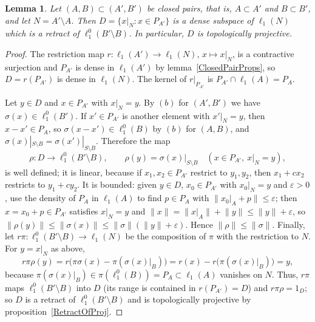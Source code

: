 \documentclass[12pt]{article}
\newtheorem{lemma}[theorem]{Lemma}
\newcommand{\lo}[1]{\ell_1^0(#1)}
\newcommand{\ellone}[1]{\ell_1(#1)}
\newcommand{\norm}[1]{\lVert #1\rVert}
\begin{document}
\begin{lemma}\label{BlockRetract} Let $(A,B)\subset(A',B')$ be closed pairs,
    that is, $A\subset A'$ and $B\subset B'$, and let $N=A'\setminus A$. Then
    $D=\{x|_N:x\in P_{A'}\}$ is a dense subspace of $\ellone{N}$ which is a
    retract of $\lo{B'\setminus B}$. In particular, $D$ is topologically
    projective.
\end{lemma}
\begin{proof} The restriction map $r:\ellone{A'}\to\ellone{N}$, $x\mapsto x|_N$,
    is a contractive surjection and $P_{A'}$ is dense in $\ellone{A'}$ by
    lemma~\ref{ClosedPairProps}, so $D=r(P_{A'})$ is dense in $\ellone{N}$.
    The kernel of $r|_{P_{A'}}$ is $P_{A'}\cap\ellone{A}=P_A$.

    Let $y\in D$ and $x\in P_{A'}$ with $x|_N=y$. By $(b)$ for $(A',B')$ we
    have $\sigma(x)\in\lo{B'}$. If $x'\in P_{A'}$ is another element with
    $x'|_N=y$, then $x-x'\in P_A$, so $\sigma(x-x')\in\lo{B}$ by $(b)$ for
    $(A,B)$, and $\sigma(x)|_{S\setminus B}=\sigma(x')|_{S\setminus B}$.
    Therefore the map
    \[
    \rho:D\to\lo{B'\setminus B},\qquad\rho(y)=\sigma(x)|_{S\setminus B}
    \quad(x\in P_{A'},\ x|_N=y),
    \]
    is well defined; it is linear, because if $x_1,x_2\in P_{A'}$ restrict
    to $y_1,y_2$, then $x_1+cx_2$ restricts to $y_1+cy_2$. It is bounded:
    given $y\in D$, $x_0\in P_{A'}$
    with $x_0|_N=y$ and $\varepsilon>0$, use the density of $P_A$ in
    $\ellone{A}$ to find $p\in P_A$ with $\norm{x_0|_A+p}\leq\varepsilon$;
    then $x=x_0+p\in P_{A'}$ satisfies $x|_N=y$ and
    $\norm{x}=\norm{x|_A}+\norm{y}\leq\norm{y}+\varepsilon$, so
    $\norm{\rho(y)}\leq\norm{\sigma(x)}\leq\norm{\sigma}(\norm{y}+\varepsilon)$.
    Hence $\norm{\rho}\leq\norm{\sigma}$. Finally, let $r\pi:\lo{B'\setminus B}\to\ellone{N}$
    be the composition of $\pi$ with the restriction to $N$. For $y=x|_N$ as
    above,
    \[
    r\pi\rho(y)=r\bigl(\pi\sigma(x)-\pi(\sigma(x)|_B)\bigr)
    =r(x)-r\bigl(\pi(\sigma(x)|_B)\bigr)=y,
    \]
    because $\pi(\sigma(x)|_B)\in\pi(\lo{B})=P_A\subset\ellone{A}$ vanishes on
    $N$. Thus, $r\pi$ maps $\lo{B'\setminus B}$ into $D$ (its range is
    contained in $r(P_{A'})=D$) and $r\pi\rho=1_D$; so $D$ is a retract of
    $\lo{B'\setminus B}$ and is topologically projective by
    proposition~\ref{RetractOfProj}.
\end{proof}
\end{document}
